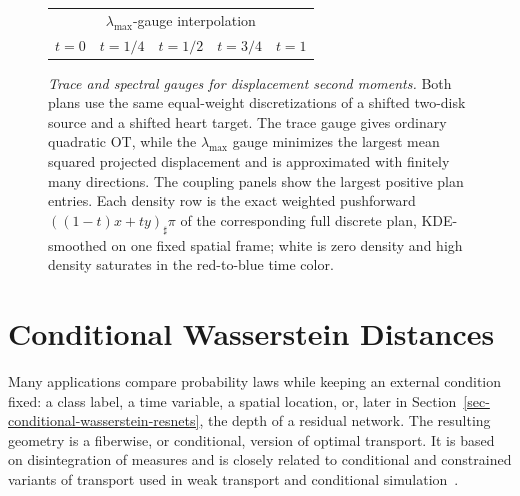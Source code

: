 \begin{figure}[H]
\begin{tabular}{@{}ccccc@{}}
\multicolumn{5}{c}{\small $\lambda_{\max}$-gauge interpolation} \\[-.1em]
\small $t=0$ & \small $t=1/4$ & \small $t=1/2$ & \small $t=3/4$ & \small $t=1$
\end{tabular}
\caption{\emph{Trace and spectral gauges for displacement second moments.} Both plans use the same equal-weight discretizations of a shifted two-disk source and a shifted heart target. The trace gauge gives ordinary quadratic OT, while the $\lambda_{\max}$ gauge minimizes the largest mean squared projected displacement and is approximated with finitely many directions. The coupling panels show the largest positive plan entries. Each density row is the exact weighted pushforward $((1-t)x+ty)_\sharp\pi$ of the corresponding full discrete plan, KDE-smoothed on one fixed spatial frame; white is zero density and high density saturates in the red-to-blue time color.}
\label{fig:spectral-wasserstein-gauge}
\end{figure}

\section{Conditional Wasserstein Distances}
\label{sec-conditional-wasserstein-distances}

Many applications compare probability laws while keeping an external condition fixed: a class label, a time variable, a spatial location, or, later in Section~\ref{sec-conditional-wasserstein-resnets}, the depth of a residual network. The resulting geometry is a fiberwise, or conditional, version of optimal transport. It is based on disintegration of measures and is closely related to conditional and constrained variants of transport used in weak transport and conditional simulation~\cite{Villani09,SantambrogioBook,backhoff2019weak,oliver2014minimization,BarboniPeyreVialard2024ConditionalResNets}.

